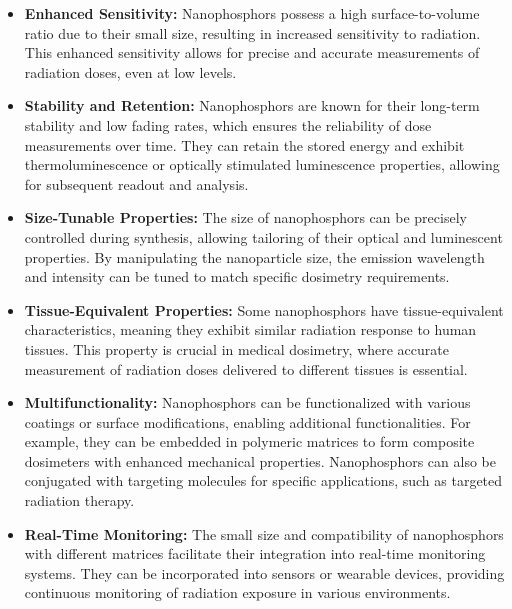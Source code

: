 \documentclass[../introduction.tex]{subfiles}
\begin{document}
        \begin{itemize}
            \item \textbf{Enhanced Sensitivity: } Nanophosphors possess a high surface-to-volume ratio due to 
            their small size, resulting in increased sensitivity to radiation. This enhanced sensitivity 
            allows for precise and accurate measurements of radiation doses, even at low levels.
    
            \item \textbf{Stability and Retention: } Nanophosphors are known for their long-term stability 
            and low fading rates, which ensures the reliability of dose measurements over time. They can 
            retain the stored energy and exhibit thermoluminescence or optically stimulated luminescence 
            properties, allowing for subsequent readout and analysis.

            \item \textbf{Size-Tunable Properties: } The size of nanophosphors can be precisely controlled 
            during synthesis, allowing tailoring of their optical and luminescent properties. By manipulating 
            the nanoparticle size, the emission wavelength and intensity can be tuned to match specific 
            dosimetry requirements.

            \item \textbf{Tissue-Equivalent Properties: } Some nanophosphors have tissue-equivalent 
            characteristics, meaning they exhibit similar radiation response to human tissues. This 
            property is crucial in medical dosimetry, where accurate measurement of radiation doses 
            delivered to different tissues is essential.

            \item \textbf{Multifunctionality: } Nanophosphors can be functionalized with various coatings or 
            surface modifications, enabling additional functionalities. For example, they can be embedded in 
            polymeric matrices to form composite dosimeters with enhanced mechanical properties. Nanophosphors 
            can also be conjugated with targeting molecules for specific applications, such as targeted 
            radiation therapy.
    
            \item \textbf{Real-Time Monitoring: } The small size and compatibility of nanophosphors with 
            different matrices facilitate their integration into real-time monitoring systems. They can be 
            incorporated into sensors or wearable devices, providing continuous monitoring of radiation 
            exposure in various environments.

        \end{itemize}
\end{document}
